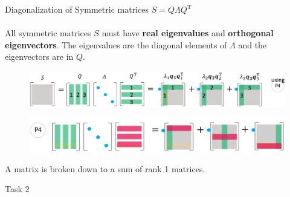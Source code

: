 \documentclass[aspectratio=169]{beamer}
\DeclareRobustCommand\transp{^{\mathrm{T}}}\usepackage{bm}
\begin{document}
\begin{frame}[t]{Diagonalization of Symmetric matrices $S = Q \Lambda Q\transp$}
\framesubtitle{}
All symmetric matrices $S$ must have \textbf{real eigenvalues} and \textbf{orthogonal eigenvectors}.
The eigenvalues are the diagonal elements of $\Lambda$ and the eigenvectors are in $Q$. 
  
  \begin{figure}[H]
    \centering
    \includegraphics[scale=1]{sqlqtr.png}
  \end{figure}
  \begin{figure}[H]
    \centering
    \includegraphics[scale=1]{pattern4.png}
  \end{figure}

  \vspace{-0.4cm}
  \centering A matrix is broken down to a sum of rank 1 matrices.

\end{frame}

\begin{frame}[t]{Task 2}
    \framesubtitle{}
\end{frame}
\end{document}
